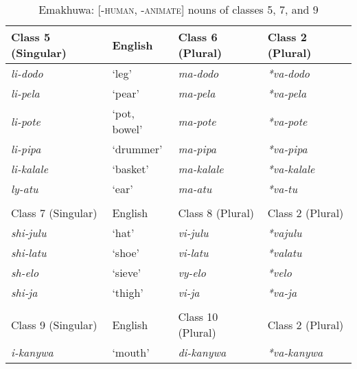 \documentclass[output=paper]{langsci/langscibook}
\begin{document}
\begin{table}
\caption{Emakhuwa: [-\textsc{human, -animate}] nouns of classes 5, 7, and 9}
\label{tab:nguna:1}

\begin{tabularx}{\textwidth}{XXXX}
\lsptoprule

 Class 5  (Singular)& English& Class 6 (Plural)& Class 2  (Plural)\\
 \midrule 
 \textit{li-dodo} &      ‘leg’       & \textit{ma-dodo}      & \textit{*va-dodo} \\
                                     
 \textit{li-pela} &      ‘pear’      & \textit{ma-pela}      & \textit{*va-pela} \\
                                     
 \textit{li-pote} &      ‘pot, bowel’& \textit{ma-pote}      & \textit{*va-pote} \\
                                     
 \textit{li-pipa} &      ‘drummer’   & \textit{ma-pipa}      & \textit{*va-pipa} \\
                                     
 {\textit{li-kalale}} &  {‘basket’}  & {\textit{ma-kalale}}  & {\textit{*va-kalale}} \\
                                     
 {\textit{ly-atu}} &     {‘ear’}     & {\textit{ma-atu}}     & {\textit{*va-tu}}\\
\\ 
 
 Class 7 (Singular)& English& Class 8 (Plural)& Class 2  (Plural)\\
 \midrule 
 \textit{shi-julu}    &‘hat’      & \textit{vi-julu}   &  \textit{*vajulu} \\

 {\textit{shi-latu}}&  {‘shoe’}   & {\textit{vi-latu}} &  {\textit{*valatu}} \\

 {\textit{sh-elo}}&    {‘sieve’} &  {\textit{vy-elo}} &   {\textit{*velo}}   \\

 \textit{shi-ja}&      ‘thigh’   &  \textit{vi-ja}   &    \textit{*va-ja}    \\
 
 \\
 Class 9  (Singular)& English& Class 10  (Plural)& Class 2 (Plural)\\
 \midrule
 \textit{i-kanywa}   & ‘mouth’  & \textit{di-kanywa}   & \textit{*va-kanywa}   \\


\end{tabularx}
\end{table}
\end{document}
